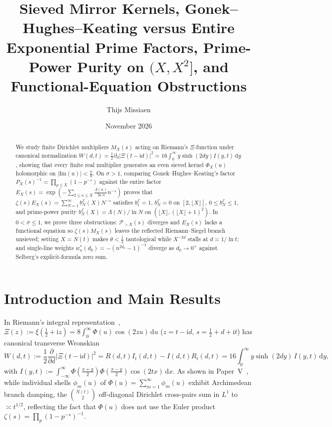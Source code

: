 \documentclass[11pt,reqno]{amsart}
\title[Sieved Mirror Kernels and Prime-Factor Obstructions]{Sieved Mirror Kernels, Gonek--Hughes--Keating versus Entire Exponential Prime Factors, Prime-Power Purity on $(X, X^2]$, and Functional-Equation Obstructions}
\author{Thijs Missiaen}
\date{November 2026}
\theoremstyle{definition}
\theoremstyle{remark}
\numberwithin{equation}{section}
\newcommand{\dd}{\mathrm{d}}
\newcommand{\ii}{\mathrm{i}}
\newcommand{\Ima}{\mathrm{Im}}
\begin{document}
\begin{abstract}
We study finite Dirichlet multipliers $M_X(s)$ acting on Riemann's $\Xi$-function under canonical normalization $W(d,t) = \frac{1}{2}\partial_d\lvert\Xi(t - \ii d)\rvert^2 = 16\int_0^{\infty} y\sinh(2dy)I(y,t)\,\dd y$, showing that every finite real multiplier generates an even sieved kernel $\Phi_X(u)$ holomorphic on $\lvert\Ima(u)\rvert < \frac{\pi}{8}$. On $\sigma > 1$, comparing Gonek--Hughes--Keating's factor $P_X(s)^{-1} = \prod_{p \le X}(1 - p^{-s})$ against the entire factor $E_X(s) = \exp(-\sum_{2 \le n \le X} \frac{\Lambda(n)}{\ln n}n^{-s})$ proves that $\zeta(s)E_X(s) = \sum_{N=1}^{\infty} b_N^{\mathcal{E}}(X)N^{-s}$ satisfies $b_1^{\mathcal{E}} = 1$, $b_N^{\mathcal{E}} = 0$ on $[2, \lfloor X\rfloor]$, $0 \le b_N^{\mathcal{E}} \le 1$, and prime-power purity $b_N^{\mathcal{E}}(X) = \Lambda(N)/\ln N$ on $(\lfloor X\rfloor, (\lfloor X\rfloor+1)^2)$. In $0 < \sigma \le 1$, we prove three obstructions: $\mathcal{P}_{>X}(s)$ diverges and $E_X(s)$ lacks a functional equation so $\zeta(s)M_X(s)$ leaves the reflected Riemann--Siegel branch unsieved; setting $X = N(t)$ makes $\theta < \frac{1}{2}$ tautological while $X^{-2d}$ stalls at $d \asymp 1/\ln t$; and single-line weights $w_n^*(d_0) = -(n^{2d_0}-1)^{-1}$ diverge as $d_0 \to 0^+$ against Selberg's explicit-formula zero sum.
\end{abstract}

\maketitle

\section{Introduction and Main Results}\label{sec:intro}

In Riemann's integral representation~\cite{riemann1859,jacobi1829,polya1926,titchmarsh1986}, $\Xi(z) := \xi(\frac{1}{2} + \ii z) = 8\int_0^{\infty} \Phi(u)\cos(2zu)\,\dd u$ ($z = t - \ii d$, $s = \frac{1}{2} + d + \ii t$) has canonical transverse Wronskian~\cite{speiser1934,lagarias1999,hinkkanen1997,csordas1986,wigner1932,hudson1974}
\begin{equation}\label{eq:W_canonical_p6}
W(d,t) := \frac{1}{2}\frac{\partial}{\partial d}\bigl\lvert\Xi(t - \ii d)\bigr\rvert^2 = R(d,t)I_t(d,t) - I(d,t)R_t(d,t) = 16\int_0^{\infty} y\sinh(2dy)\,I(y,t)\,\dd y,
\end{equation}
with $I(y,t) := \int_{-\infty}^{\infty} \Phi(\frac{x+y}{2})\Phi(\frac{x-y}{2})\cos(2tx)\,\dd x$. As shown in Paper~V~\cite{missiaen2026p5}, while individual shells $\phi_m(u)$ of $\Phi(u) = \sum_{m=1}^{\infty} \phi_m(u)$ exhibit Archimedean branch damping, the $\binom{N(t)}{2}$ off-diagonal Dirichlet cross-pairs sum in $L^1$ to $\asymp t^{1/2}$, reflecting the fact that $\Phi(u)$ does not use the Euler product $\zeta(s) = \prod_p (1 - p^{-s})^{-1}$.
\end{document}

